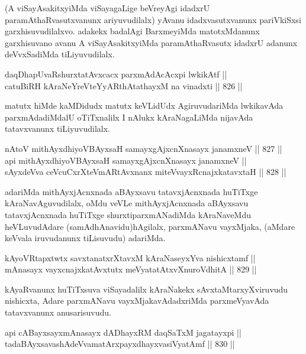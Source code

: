 \begin{artha}
(A viSayAsakitxyiMda viSayagaLige beVreyAgi idadxrU paramAthaRvasutxvanunx ariyuvudilalx) yAvanu idadxvasutxvanunx pariVkiSxsi garxhisuvudilalxvo. adakekx badalAgi BarxmeyiMda matotxMdanunx garxhisuvano avanu A viSayAsakitxyiMda paramAthaRvasutx idadxrU adanunx deVvxSadiMda tiLiyuvudilalx.
\end{artha}

\begin{shl}
daqDhapUvaRshurxtatAvxcacx parxmAdAcAcxpi lwkikAtf || \\
catuBiRH kAraNeYreVteYyARthAtathayxM na vinadxti \hfill || 826 ||  
\end{shl}

\begin{artha}
matutx hiMde kaMDidudx matutx keVLidUdx AgiruvudariMda lwkikavAda parxmAdadiMdalU oTiTxnalilx I nAlukx kAraNagaLiMda nijavAda tatavxvanunx tiLiyuvudilalx.
\end{artha}

\begin{shl}
nAtoV mithAyxdhiyoV\s BAyxsaH samayxgAjxcnXnasayx janamxneV \hfill || 827 ||  \\
api mithAyxdhiyoV\s BAyxsaH samayxgAjxcnXnasayx janamxneV || \\
sAyxdeVva ceVcuCxrXteVmARtAvxnanx miteVvayxRcnajxkatavxtaH \hfill || 828 ||  
\end{shl}

\begin{artha}
adariMda mithAyxjAcnxnada aBAyxsavu tatavxjAcnxnada huTiTxge kAraNavAguvudilalx, oMdu veVLe mithAyxjAcnxnada aBAyxsavu tatavxjAcnxnada huTiTxge shurxtiparxmANadiMda kAraNaveMdu heVLuvudAdare (samAdhAnavidu)\ndash  hAgilalx, parxmANavu vayxMjaka, (aMdare keVvala iruvudanunx tiLisuvudu) adariMda.
\end{artha}

\begin{shl}
kAyoVRtapxtwtx savxtanatxrXtavxM kAraNaseyxYva nishicxtamf || \\
mAnasayx vayxcnajxkatAvxtutx meVyatatAtxvXnuroVdhitA \hfill || 829 ||  
\end{shl}

\begin{artha}
kAyaRvanunx huTiTxsuva viSayadalilx kAraNakekx sAvxtaMtarxyXviruvudu nishicxta, Adare parxmANavu vayxMjakavAdadxriMda parxmeVyavAda tatavxvanunx anusarisuvudu.
\end{artha}

\begin{shl}
api cABayxsayxmAnasayx dADhayxRM daqSaTxM jagatayxpi || \\
tadaBAyxsavashAdeVvamatArxpayxdhayxvasiVyatAmf \hfill || 830 ||  
\end{shl}

